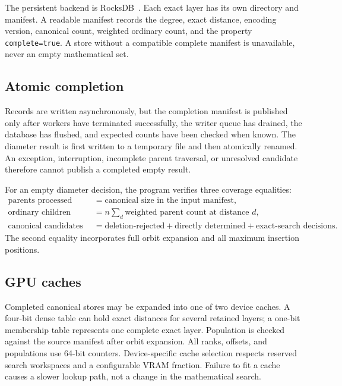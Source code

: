 \documentclass[11pt]{article}
\theoremstyle{definition}
\theoremstyle{remark}
\newcommand{\code}[1]{\texttt{#1}}
\begin{document}
The persistent backend is RocksDB~\cite{RocksDB}.  Each exact layer has its
own directory and manifest.  A readable manifest records the degree, exact
distance, encoding version, canonical count, weighted ordinary count, and
the property \code{complete=true}.  A store without a compatible complete
manifest is unavailable, never an empty mathematical set.

\subsection{Atomic completion}

Records are written asynchronously, but the completion manifest is published
only after workers have terminated successfully, the writer queue has drained,
the database has flushed, and expected counts have been checked when known.
The diameter result is first written to a temporary file and then atomically
renamed.  An exception, interruption, incomplete parent traversal, or
unresolved candidate therefore cannot publish a completed empty result.

For an empty diameter decision, the program verifies three coverage
equalities:
\begin{align*}
  \text{parents processed}
    &=\text{canonical size in the input manifest},\\
  \text{ordinary children generated}
    &=n\sum_d\text{weighted parent count at distance }d,\\
  \text{canonical candidates}
    &=\text{deletion-rejected}+
      \text{directly determined}+
      \text{exact-search decisions}.            \tag{7.1}\label{eq:coverage}
\end{align*}
The second equality incorporates full orbit expansion and all maximum
insertion positions.

\subsection{GPU caches}

Completed canonical stores may be expanded into one of two device caches.
A four-bit dense table can hold exact distances for several retained layers;
a one-bit membership table represents one complete exact layer.  Population
is checked against the source manifest after orbit expansion.  All ranks,
offsets, and populations use 64-bit counters.  Device-specific cache
selection respects reserved search workspaces and a configurable VRAM
fraction.  Failure to fit a cache causes a slower lookup path, not a change in
the mathematical search.
\end{document}
